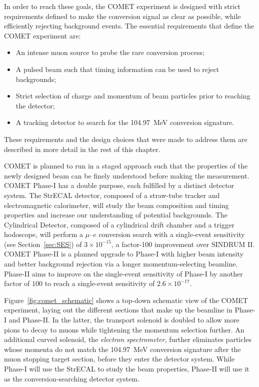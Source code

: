 In order to reach these goals, the COMET experiment is designed with strict
requirements defined to make the conversion signal as clear as possible, while
efficiently rejecting background events. The essential requirements that define
the COMET experiment are:
\begin{itemize}
    \item An intense muon source to probe the rare conversion process;
    \item A pulsed beam such that timing information can be used to reject backgrounds;
    \item Strict selection of charge and momentum of beam particles prior to
    reaching the detector;
    \item A tracking detector to search for the \SI{104.97}{\MeV} conversion signature.
\end{itemize}
These requirements and the design choices that were made to address them are
described in more detail in the rest of this chapter.

COMET is planned to run in a staged approach such that the properties of the
newly designed beam can be finely understood before making the measurement.
COMET Phase-I has a double purpose, each fulfilled by a distinct detector
system. The StrECAL detector, composed of a straw-tube tracker and
electromagnetic calorimeter, will study the beam composition and timing
properties and increase our understanding of potential backgrounds. The
Cylindrical Detector, composed of a cylindrical drift chamber and a trigger
hodoscope, will perform a $\mu$--$e$ conversion search with a single-event
sensitivity (see Section~\ref{sec:SES}) of $3\times 10^{-15}$, a factor-100
improvement over SINDRUM II. COMET Phase-II is a planned upgrade to Phase-I with
higher beam intensity and better background rejection via a longer
momentum-selecting beamline. Phase-II aims to improve on the single-event
sensitivity of Phase-I by another factor of $100$ to reach a single-event
sensitivity of $2.6\times 10^{-17}$.

Figure~\ref{fig:comet_schematic} shows a top-down schematic view of the COMET
experiment, laying out the different sections that make up the beamline in
Phase-I and Phase-II. In the latter, the transport solenoid is doubled to allow
more pions to decay to muons while tightening the momentum selection further. An
additional curved solenoid, the \emph{electron spectrometer,} further eliminates
particles whose momenta do not match the \SI{104.97}{\MeV} conversion signature
after the muon stopping target section, before they enter the detector system.
While Phase-I will use the StrECAL to study the beam properties, Phase-II will
use it as the conversion-searching detector system.

